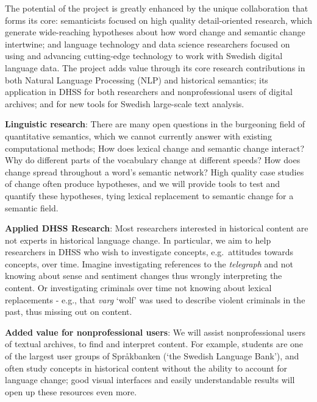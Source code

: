 \documentclass[12pt,twoside,a4paper]{article}
\newcommand\eg{{e.g.\ }}
\begin{document}
    The potential of the project is greatly enhanced by the unique collaboration that forms its core: semanticists focused on high quality detail-oriented research, which generate wide-reaching hypotheses about how word change and semantic change intertwine; and language technology and data science researchers focused on using and advancing cutting-edge technology to work with Swedish digital language data. 
	The project adds value through its core research contributions in both Natural Language Processing (NLP) and historical semantics; its application in DHSS for both researchers and nonprofessional users of digital archives; and for new tools for Swedish large-scale text analysis.	\begin{compactitem}
        \item \textbf{Linguistic research}:  There are many open questions in the burgeoning field of quantitative semantics, which we cannot currently answer with existing computational methods; How does lexical change and semantic change interact? Why do different parts of the vocabulary change at different speeds? How does change spread throughout a word's semantic network? High quality case studies of change often produce hypotheses, and we will provide tools to test and quantify these hypotheses, tying lexical replacement to semantic change for a semantic field.
		\item	\textbf{Applied DHSS Research}: Most researchers interested in historical content are not experts in historical language change. In particular, we aim to help researchers in DHSS who wish to investigate concepts, \eg attitudes towards concepts, over time.
        Imagine investigating references to the \textit{telegraph} and not knowing about sense and sentiment changes   thus wrongly interpreting the content. Or investigating criminals over time not knowing about lexical replacements - e.g., that \textit{varg} `wolf' was used to describe violent criminals in the past,     thus missing out on content. 
	\item	\textbf{Added value for nonprofessional users}: We will assist nonprofessional users of textual archives,   to find and interpret content. For example, students are one of the largest user groups     of Språkbanken (`the Swedish Language Bank'), and often study concepts in historical content without the ability to account for language change; good visual interfaces and easily understandable results will open up these resources even more. 
	\end{compactitem}
	
\end{document}
